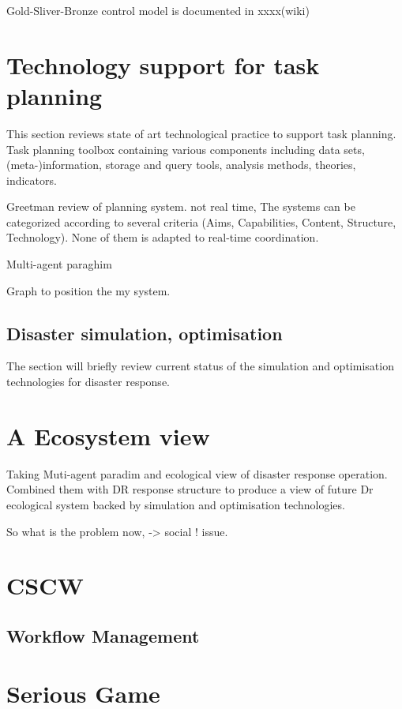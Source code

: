 Gold-Sliver-Bronze control model is documented in xxxx(wiki)

\section{Technology support for task planning}
This section reviews state of art technological practice to support task planning. Task planning toolbox containing various components including data sets, (meta-)information, storage and query tools, analysis methods, theories, indicators.

Greetman review of planning system. not real time, The systems can be categorized according to several criteria (Aims, Capabilities, Content, Structure, Technology). None of them is adapted to real-time coordination.

Multi-agent paraghim 


Graph to position the my system. 

\subsection{Disaster simulation, optimisation}
The section will briefly review current status of the simulation and optimisation technologies for disaster response.



\section{A Ecosystem view}

Taking Muti-agent paradim and ecological view of disaster response operation. Combined them with DR response structure to produce a view of future Dr ecological system backed by simulation and optimisation technologies. 

So what is the problem now, -> social ! issue. 


\section{CSCW}


\subsection{Workflow Management}



\section{Serious Game}








